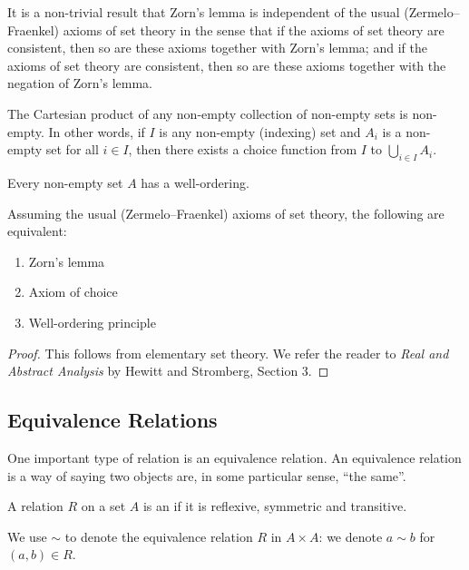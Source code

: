 It is a non-trivial result that Zorn's lemma is independent of the usual (Zermelo--Fraenkel) axioms of set theory in the sense that if the axioms of set theory are consistent, then so are these axioms together with Zorn's lemma; and if the axioms of set theory are consistent, then so are these axioms together with the negation of Zorn's lemma.

\begin{lemma}
The Cartesian product of any non-empty collection of non-empty sets is non-empty. In other words, if $I$ is any non-empty (indexing) set and $A_i$ is a non-empty set for all $i\in I$, then there exists a choice function from $I$ to $\bigcup_{i\in I}A_i$.
\end{lemma}

\begin{lemma}
Every non-empty set $A$ has a well-ordering.
\end{lemma}

\begin{theorem}
Assuming the usual (Zermelo--Fraenkel) axioms of set theory, the following are equivalent:
\begin{enumerate}[label=(\roman*)]
\item Zorn's lemma
\item Axiom of choice
\item Well-ordering principle
\end{enumerate}
\end{theorem}

\begin{proof}
This follows from elementary set theory. We refer the reader to \textit{Real and Abstract Analysis} by Hewitt and Stromberg, Section 3.
\end{proof}

\subsection{Equivalence Relations}
One important type of relation is an equivalence relation. An equivalence relation is a way of saying two objects are, in some particular sense, ``the same''.

\begin{definition}
A relation $R$ on a set $A$ is an  if it is reflexive, symmetric and transitive.
\end{definition}

\begin{notation}
We use $\sim$ to denote the equivalence relation $R$ in $A\times A$: we denote $a\sim b$ for $(a,b)\in R$.
\end{notation}

